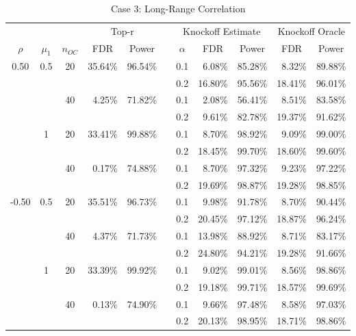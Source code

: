 \documentclass[]{interact}
\theoremstyle{plain}%
\theoremstyle{definition}
\theoremstyle{remark}
\begin{document}
\begin{table}[htbp]
  \centering
  \caption{Case 3: Long-Range Correlation}
    \begin{tabular}{cccrrrrrrrr}
    \toprule
      &   &   & \multicolumn{2}{c}{Top-r} &   & \multicolumn{3}{c}{Knockoff Estimate} & \multicolumn{2}{c}{Knockoff Oracle} \\
\cmidrule{4-5}\cmidrule{7-11}    \multicolumn{1}{c}{$\rho$} & \multicolumn{1}{c}{$\mu_1$} & \multicolumn{1}{c}{$n_{OC}$} & \multicolumn{1}{c}{FDR} & \multicolumn{1}{c}{Power} &   & \multicolumn{1}{c}{$\alpha$} & \multicolumn{1}{c}{FDR} & \multicolumn{1}{c}{Power} & \multicolumn{1}{c}{FDR} & \multicolumn{1}{c}{Power} \\
    \midrule
    0.50 & 0.5 & 20 & 35.64\% & 96.54\% &   & 0.1 & 6.08\% & 85.28\% & 8.32\% & 89.88\% \\
      &   &   &   &   &   & 0.2 & 16.80\% & 95.56\% & 18.41\% & 96.01\% \\
      &   & 40 & 4.25\% & 71.82\% &   & 0.1 & 2.08\% & 56.41\% & 8.51\% & 83.58\% \\
      &   &   &   &   &   & 0.2 & 9.61\% & 82.78\% & 19.37\% & 91.62\% \\
      & 1 & 20 & 33.41\% & 99.88\% &   & 0.1 & 8.70\% & 98.92\% & 9.09\% & 99.00\% \\
      &   &   &   &   &   & 0.2 & 18.45\% & 99.70\% & 18.60\% & 99.60\% \\
      &   & 40 & 0.17\% & 74.88\% &   & 0.1 & 8.70\% & 97.32\% & 9.23\% & 97.22\% \\
      &   &   &   &   &   & 0.2 & 19.69\% & 98.87\% & 19.28\% & 98.85\% \\
    -0.50 & 0.5 & 20 & 35.51\% & 96.73\% &   & 0.1 & 9.98\% & 91.78\% & 8.70\% & 90.44\% \\
      &   &   &   &   &   & 0.2 & 20.45\% & 97.12\% & 18.87\% & 96.24\% \\
      &   & 40 & 4.37\% & 71.73\% &   & 0.1 & 13.98\% & 88.92\% & 8.71\% & 83.17\% \\
      &   &   &   &   &   & 0.2 & 24.80\% & 94.21\% & 19.28\% & 91.66\% \\
      & 1 & 20 & 33.39\% & 99.92\% &   & 0.1 & 9.02\% & 99.01\% & 8.56\% & 98.86\% \\
      &   &   &   &   &   & 0.2 & 19.18\% & 99.71\% & 18.57\% & 99.69\% \\
      &   & 40 & 0.13\% & 74.90\% &   & 0.1 & 9.66\% & 97.48\% & 8.58\% & 97.03\% \\
      &   &   &   &   &   & 0.2 & 20.13\% & 98.95\% & 18.71\% & 98.86\% \\
      \bottomrule
    \end{tabular}%
  \label{tab:addlabel}%
\end{table}%
\end{document}
